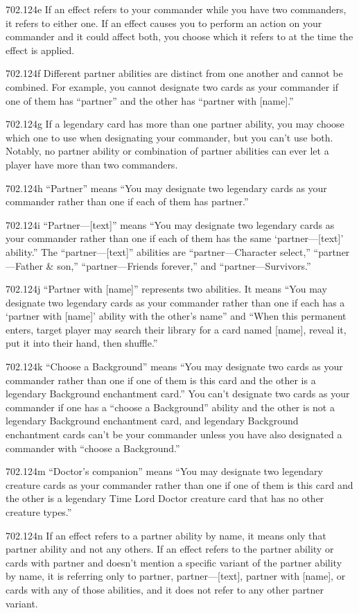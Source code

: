 702.124e If an effect refers to your commander while you have two commanders, it refers to either one. If an effect causes you to perform an action on your commander and it could affect both, you choose which it refers to at the time the effect is applied.

702.124f Different partner abilities are distinct from one another and cannot be combined. For example, you cannot designate two cards as your commander if one of them has “partner” and the other has “partner with [name].”

702.124g If a legendary card has more than one partner ability, you may choose which one to use when designating your commander, but you can’t use both. Notably, no partner ability or combination of partner abilities can ever let a player have more than two commanders.

702.124h “Partner” means “You may designate two legendary cards as your commander rather than one if each of them has partner.”

702.124i “Partner—[text]” means “You may designate two legendary cards as your commander rather than one if each of them has the same ‘partner—[text]’ ability.” The “partner—[text]” abilities are “partner—Character select,” “partner—Father \& son,” “partner—Friends forever,” and “partner—Survivors.”

702.124j “Partner with [name]” represents two abilities. It means “You may designate two legendary cards as your commander rather than one if each has a ‘partner with [name]’ ability with the other’s name” and “When this permanent enters, target player may search their library for a card named [name], reveal it, put it into their hand, then shuffle.”

702.124k “Choose a Background” means “You may designate two cards as your commander rather than one if one of them is this card and the other is a legendary Background enchantment card.” You can’t designate two cards as your commander if one has a “choose a Background” ability and the other is not a legendary Background enchantment card, and legendary Background enchantment cards can’t be your commander unless you have also designated a commander with “choose a Background.”

702.124m “Doctor’s companion” means “You may designate two legendary creature cards as your commander rather than one if one of them is this card and the other is a legendary Time Lord Doctor creature card that has no other creature types.”

702.124n If an effect refers to a partner ability by name, it means only that partner ability and not any others. If an effect refers to the partner ability or cards with partner and doesn’t mention a specific variant of the partner ability by name, it is referring only to partner, partner—[text], partner with [name], or cards with any of those abilities, and it does not refer to any other partner variant.

